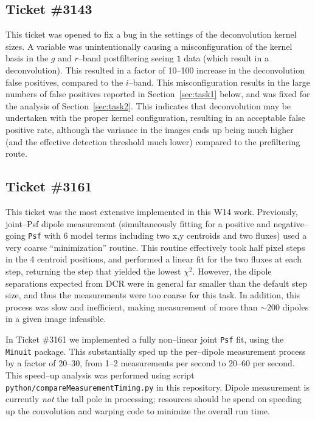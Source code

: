 \documentclass[DM,toc]{lsstdoc}
\begin{document}
\subsection{Ticket \#3143 \label{sec:3143}}

This ticket was opened to fix a bug in the settings of the
deconvolution kernel sizes.  A variable was unintentionally causing a
misconfiguration of the kernel basis in the $g$ and $r$--band
postfiltering seeing {\tt 1} data (which result in a deconvolution).
This resulted in a factor of 10--100 increase in the deconvolution
false positives, compared to the $i$--band.  This misconfiguration
results in the large numbers of false positives reported in
Section~\ref{sec:task1} below, and was fixed for the analysis of
Section~\ref{sec:task2}.  This indicates that deconvolution may be
undertaken with the proper kernel configuration, resulting in an
acceptable false positive rate, although the variance in the images
ends up being much higher (and the effective detection threshold much
lower) compared to the prefiltering route.

\subsection{Ticket \#3161 \label{sec:3161}}

This ticket was the most extensive implemented in this W14 work.
Previously, joint--Psf dipole measurement (simultaneously fitting for
a positive and negative--going {\tt Psf} with 6 model terms including
two x,y centroids and two fluxes) used a very coarse ``minimization''
routine.  This routine effectively took half pixel steps in the 4
centroid positions, and performed a linear fit for the two fluxes at
each step, returning the step that yielded the lowest $\chi^2$.
However, the dipole separations expected from DCR were in general far
smaller than the default step size, and thus the measurements were too
coarse for this task.  In addition, this process was slow and
inefficient, making measurement of more than $\sim 200$ dipoles in a
given image infeasible.

In Ticket \#3161 we implemented a fully non--linear joint {\tt Psf}
fit, using the {\tt Minuit} package.  This substantially sped up the
per--dipole measurement process by a factor of 20--30, from 1--2
measurements per second to 20--60 per second.  This speed--up analysis
was performed using script {\tt python/compareMeasurementTiming.py} in
this repository.  Dipole measurement is currently {\it not} the tall
pole in processing; resources should be spend on speeding up the
convolution and warping code to minimize the overall run time.
\end{document}
